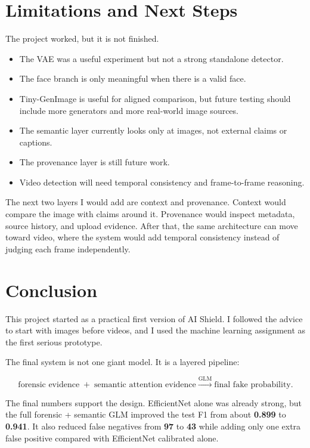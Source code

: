 \documentclass[11pt]{article}
\begin{document}
\section{Limitations and Next Steps}

The project worked, but it is not finished.

\begin{itemize}
    \item The VAE was a useful experiment but not a strong standalone detector.
    \item The face branch is only meaningful when there is a valid face.
    \item Tiny-GenImage is useful for aligned comparison, but future testing should include more generators and more real-world image sources.
    \item The semantic layer currently looks only at images, not external claims or captions.
    \item The provenance layer is still future work.
    \item Video detection will need temporal consistency and frame-to-frame reasoning.
\end{itemize}

The next two layers I would add are context and provenance. Context would compare the image with claims around it. Provenance would inspect metadata, source history, and upload evidence. After that, the same architecture can move toward video, where the system would add temporal consistency instead of judging each frame independently.

\section{Conclusion}

This project started as a practical first version of AI Shield. I followed the advice to start with images before videos, and I used the machine learning assignment as the first serious prototype.

The final system is not one giant model. It is a layered pipeline:

\[
\text{forensic evidence}
\;+\;
\text{semantic attention evidence}
\xrightarrow{\mathrm{GLM}}
\text{final fake probability}.
\]

The final numbers support the design. EfficientNet alone was already strong, but the full forensic + semantic GLM improved the test F1 from about \textbf{0.899} to \textbf{0.941}. It also reduced false negatives from \textbf{97} to \textbf{43} while adding only one extra false positive compared with EfficientNet calibrated alone.
\end{document}
